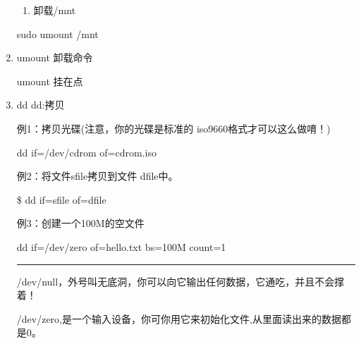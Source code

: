 \documentclass[11pt]{article}
\begin{document}
\begin{enumerate}
\begin{enumerate}
\item 卸载/mnt
\end{enumerate}

sudo umount /mnt

\item umount
\label{sec-1-1-6-2}
卸载命令

umount 挂在点
\item dd
\label{sec-1-1-6-3}
dd:拷贝

例1：拷贝光碟(注意，你的光碟是标准的 iso9660格式才可以这么做唷！) 

dd if=/dev/cdrom of=cdrom.iso 


例2：将文件sfile拷贝到文件 dfile中。 

\$ dd if=sfile of=dfile



例3：创建一个100M的空文件

dd if=/dev/zero of=hello.txt bs=100M count=1

\rule{\linewidth}{0.5pt}

/dev/null，外号叫无底洞，你可以向它输出任何数据，它通吃，并且不会撑着！

/dev/zero,是一个输入设备，你可你用它来初始化文件,从里面读出来的数据都是0。
\end{enumerate}
\end{document}
